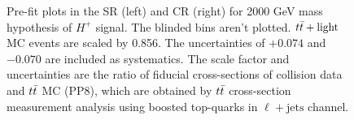 \begin{figure}[H]
  \centering
  \caption{Pre-fit plots in the SR (left) and CR (right) for 2000 GeV mass hypothesis of $H^{+}$ signal. The blinded bins aren't plotted. $t\Bar{t}+\text{light}$ MC events are scaled by 0.856. The uncertainties of $+0.074$ and $-0.070$ are included as systematics. The scale factor and uncertainties are the ratio of fiducial cross-sections of collision data and $t\Bar{t}$ MC (PP8), which are obtained by $t\Bar{t}$ cross-section measurement analysis using boosted top-quarks in $\ell+\text{jets}$ channel.}
  \label{fig:Prefit_Hp2000_Blind_with_ttlight_constrained}
\end{figure}
